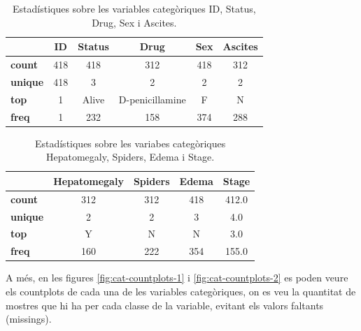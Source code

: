 \begin{table}[H]
\centering
\begin{tabular}{|l|c|c|c|c|c|}
\hline
\textbf{} & \textbf{ID} & \textbf{Status} & \textbf{Drug} & \textbf{Sex} & \textbf{Ascites} \\ \hline
\textbf{count}     & 418         & 418             & 312            & 418           & 312              \\ \hline
\textbf{unique}    & 418         & 3               & 2              & 2             & 2                \\ \hline
\textbf{top}       & 1           & Alive           & D-penicillamine & F             & N                \\ \hline
\textbf{freq}      & 1           & 232             & 158            & 374           & 288              \\ \hline
\end{tabular}
\caption{Estadístiques sobre les variables categòriques ID, Status, Drug, Sex i Ascites.}
\label{tab:cat-stats-1}
\end{table}

\begin{table}[H]
\centering
\begin{tabular}{|l|c|c|c|c|}
\hline
\textbf{} & \textbf{Hepatomegaly} & \textbf{Spiders} & \textbf{Edema} & \textbf{Stage} \\ \hline
\textbf{count}     & 312                    & 312              & 418             & 412.0          \\ \hline
\textbf{unique}    & 2                      & 2                & 3               & 4.0            \\ \hline
\textbf{top}       & Y                      & N                & N               & 3.0            \\ \hline
\textbf{freq}      & 160                    & 222              & 354             & 155.0          \\ \hline
\end{tabular}
\caption{Estadístiques sobre les variabes categòriques Hepatomegaly, Spiders, Edema i Stage.}
\label{tab:cat-stats-2}
\end{table}

A més, en les figures \ref{fig:cat-countplots-1} i \ref{fig:cat-countplots-2} es poden veure els countplots de cada una de les variables categòriques, on es veu la quantitat de mostres que hi ha per cada classe de la variable, evitant els valors faltants (missings).


